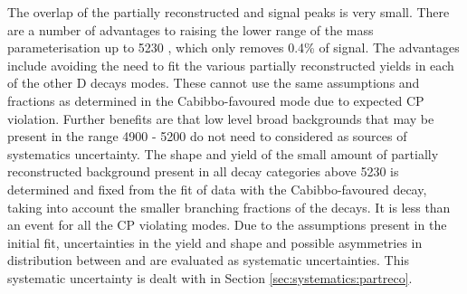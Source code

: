 The overlap of the partially reconstructed and signal peaks is very small. There are a number of advantages to raising the lower range of the mass parameterisation up to 5230 \mev, which only removes 0.4\% of signal. The advantages include avoiding the need to fit the various partially reconstructed yields in each of the other D decays modes. These cannot use the same assumptions and fractions as determined in the Cabibbo-favoured mode due to expected CP violation. Further benefits are that low level broad backgrounds that may be present in the range 4900 - 5200 \mev do not need to considered as sources of systematics uncertainty. The shape and yield of the small amount of partially reconstructed background present in all \D decay categories above 5230 \mev is determined and fixed from the fit of data with the Cabibbo-favoured decay, taking into account the smaller branching fractions of the \D decays. It is less than an event for all the CP violating modes. Due to the assumptions present in the initial fit, uncertainties in the yield and shape and possible asymmetries in distribution between \Bp and \Bm are evaluated as systematic uncertainties. This systematic uncertainty is dealt with in Section \ref{sec:systematics:partreco}.


\clearpage
